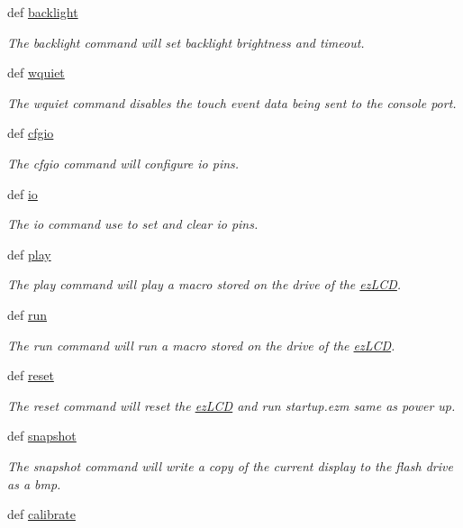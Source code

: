 \begin{DoxyCompactItemize}
def \hyperlink{group___general_gacecf5c1b5956caef4a4030f51bc4a809}{backlight}
\begin{DoxyCompactList}\small\item\em The backlight command will set backlight brightness and timeout. \end{DoxyCompactList}\item 
def \hyperlink{group___general_ga78b38855b8bcb0609d340a80210a0d0f}{wquiet}
\begin{DoxyCompactList}\small\item\em The wquiet command disables the touch event data being sent to the console port. \end{DoxyCompactList}\item 
def \hyperlink{group___general_ga38687b7d07bf93afe6891d3dca6205f4}{cfgio}
\begin{DoxyCompactList}\small\item\em The cfgio command will configure io pins. \end{DoxyCompactList}\item 
def \hyperlink{group___general_gaf87ad0b88f8a279c20666363bc7460b6}{io}
\begin{DoxyCompactList}\small\item\em The io command use to set and clear io pins. \end{DoxyCompactList}\item 
def \hyperlink{group___general_ga15f87f284189816d98ab5bf0b5a94a99}{play}
\begin{DoxyCompactList}\small\item\em The play command will play a macro stored on the drive of the \hyperlink{classez_l_c_d3xx_1_1ez_l_c_d}{ez\-L\-C\-D}. \end{DoxyCompactList}\item 
def \hyperlink{group___general_ga7faa11f7fbe4da6ba981a5b8c4cb37aa}{run}
\begin{DoxyCompactList}\small\item\em The run command will run a macro stored on the drive of the \hyperlink{classez_l_c_d3xx_1_1ez_l_c_d}{ez\-L\-C\-D}. \end{DoxyCompactList}\item 
def \hyperlink{group___general_gabc1cd3bb62dfa8a8f37f5da5cbb3e85c}{reset}
\begin{DoxyCompactList}\small\item\em The reset command will reset the \hyperlink{classez_l_c_d3xx_1_1ez_l_c_d}{ez\-L\-C\-D} and run startup.\-ezm same as power up. \end{DoxyCompactList}\item 
def \hyperlink{group___general_ga8a1ef000b3c71704260c9e5f949e80de}{snapshot}
\begin{DoxyCompactList}\small\item\em The snapshot command will write a copy of the current display to the flash drive as a bmp. \end{DoxyCompactList}\item 
\hypertarget{group___general_gae53650dc26de7b1316c9241eec0751bb}{def \hyperlink{group___general_gae53650dc26de7b1316c9241eec0751bb}{calibrate}}\label{group___general_gae53650dc26de7b1316c9241eec0751bb}


\end{DoxyCompactItemize}
